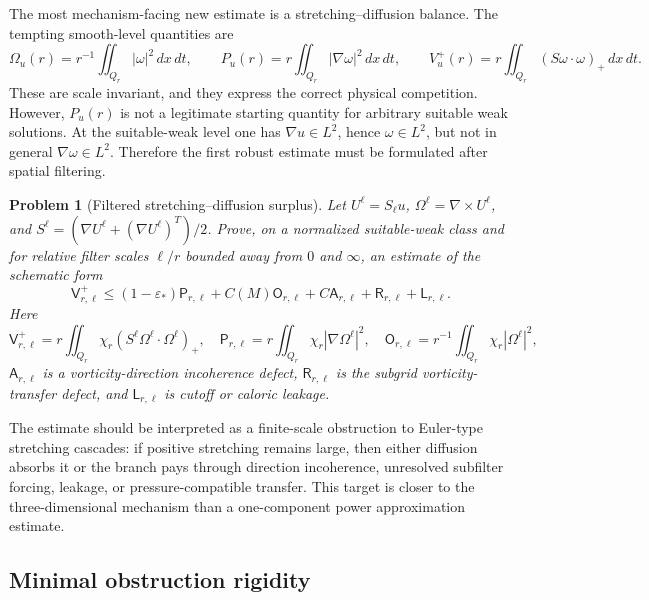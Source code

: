 \documentclass[11pt]{article}
\numberwithin{equation}{section}
\newtheorem{problem}[theorem]{Problem}
\theoremstyle{remark}
\newcommand{\eps}{\varepsilon}
\newcommand{\dxdt}{\,dx\,dt}
\begin{document}
The most mechanism-facing new estimate is a stretching--diffusion balance. The tempting smooth-level quantities are
\begin{equation}\label{eq:smooth-stretching-quantities}
\Omega_
u(r)=r^{-1}\iint_{Q_r}|\omega|^2\dxdt,
\qquad
P_
u(r)=r\iint_{Q_r}|\nabla\omega|^2\dxdt,
\qquad
V_
u^+(r)=r\iint_{Q_r}(S\omega\cdot\omega)_+\dxdt.
\end{equation}
These are scale invariant, and they express the correct physical competition. However, $P_u(r)$ is not a legitimate starting quantity for arbitrary suitable weak solutions. At the suitable-weak level one has $\nabla u\in L^2$, hence $\omega\in L^2$, but not in general $\nabla\omega\in L^2$. Therefore the first robust estimate must be formulated after spatial filtering.

\begin{problem}[Filtered stretching--diffusion surplus]\label{prob:filtered-stretching-surplus}
Let $U^\ell=S_\ell u$, $\Omega^\ell=\nabla\times U^\ell$, and $S^\ell=(\nabla U^\ell+(\nabla U^\ell)^T)/2$. Prove, on a normalized suitable-weak class and for relative filter scales $\ell/r$ bounded away from $0$ and $\infty$, an estimate of the schematic form
\begin{equation}\label{eq:filtered-stretching-surplus}
\mathsf V_{r,\ell}^+
\le
(1-\eps_*)\mathsf P_{r,\ell}
+C(M)\mathsf O_{r,\ell}
+C\mathsf A_{r,\ell}
+\mathsf R_{r,\ell}
+\mathsf L_{r,\ell}.
\end{equation}
Here
\[
\mathsf V_{r,\ell}^+=r\iint_{Q_r}\chi_r(S^\ell\Omega^\ell\cdot\Omega^\ell)_+,
\quad
\mathsf P_{r,\ell}=r\iint_{Q_r}\chi_r|\nabla\Omega^\ell|^2,
\quad
\mathsf O_{r,\ell}=r^{-1}\iint_{Q_r}\chi_r|\Omega^\ell|^2,
\]
$\mathsf A_{r,\ell}$ is a vorticity-direction incoherence defect, $\mathsf R_{r,\ell}$ is the subgrid vorticity-transfer defect, and $\mathsf L_{r,\ell}$ is cutoff or caloric leakage.
\end{problem}

The estimate should be interpreted as a finite-scale obstruction to Euler-type stretching cascades: if positive stretching remains large, then either diffusion absorbs it or the branch pays through direction incoherence, unresolved subfilter forcing, leakage, or pressure-compatible transfer. This target is closer to the three-dimensional mechanism than a one-component power approximation estimate.

\subsection{Minimal obstruction rigidity}
\end{document}

